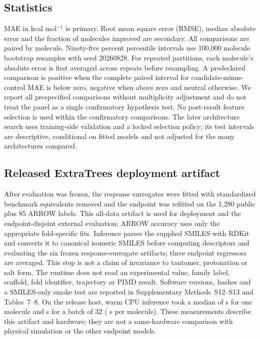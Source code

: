 \documentclass[12pt]{article}
\begin{document}


\subsection*{Statistics}

MAE in kcal mol$^{-1}$ is primary. Root mean square error (RMSE), median absolute error and the fraction of
molecules improved are secondary. All comparisons are paired by molecule.
Ninety-five percent percentile intervals use 100,000 molecule bootstrap resamples
with seed 20260828. For repeated partitions, each molecule's absolute error is first
averaged across repeats before resampling. A predeclared comparison is positive when
the complete paired interval for candidate-minus-control MAE is below zero, negative
when above zero and neutral otherwise. We report all prespecified comparisons
without multiplicity adjustment and do not treat the panel as a single confirmatory
hypothesis test. No post-result feature selection is used within the confirmatory
comparisons. The later architecture search uses training-side validation and a
locked selection policy; its test intervals are descriptive, conditional on fitted
models and not adjusted for the many architectures compared.

\subsection*{Released ExtraTrees deployment artifact}

After evaluation was frozen, the response surrogates were fitted with standardized
benchmark equivalents removed and the endpoint was refitted on the 1,280 public plus
85 ARROW labels. This all-data artifact is used for deployment and the
endpoint-disjoint external evaluation; ARROW accuracy uses only the appropriate
fold-specific fits. Inference parses the supplied SMILES with RDKit and converts it to canonical
isomeric SMILES before computing descriptors and evaluating the six frozen
response-surrogate artifacts; three endpoint regressors are averaged. This step is
not a claim of invariance to tautomer, protonation or salt form. The runtime does not
read an experimental value, family label, scaffold, fold identifier, trajectory or
PIMD result. Software versions, hashes and a SMILES-only smoke test are reported in
Supplementary Methods~S12--S13 and Tables~7--8.
On the release host, warm CPU inference took a median of \WarmSingleSeconds{} s
for one molecule and \BatchSeconds{} s for a batch of 32
(\BatchPerMoleculeSeconds{} s per molecule). These measurements describe this
artifact and hardware; they are not a same-hardware comparison with physical
simulation or the other endpoint models.
\end{document}
